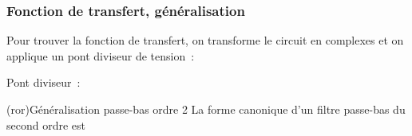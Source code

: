 \documentclass[../../main/main.tex]{subfiles}
\begin{document}
\subsubsection{Fonction de transfert, généralisation}
Pour trouver la fonction de transfert, on transforme le circuit en complexes et
on applique un pont diviseur de tension~:
\smallbreak
\noindent
\begin{minipage}[c]{.45\linewidth}
	\begin{center}
		\vspace{-15pt}
	\end{center}
\end{minipage}
\hfill
\begin{minipage}[c]{.5\linewidth}
	Pont diviseur~:
\end{minipage}
\begin{tcb*}(ror){Généralisation passe-bas ordre 2}
	La forme canonique d'un filtre passe-bas du second ordre est
	\psw{
	\[
		\boxed{\Hu(x) = \frac{H_0}{1-x^{2} + \jj \frac{x}{Q}}}
		\qav
		x = \frac{\w}{\w_0}
		\qet
		H_0 = \cte
		\qet
		Q \text{~ facteur de qualité}
	\]
	}
	\vspace{-15pt}
\end{tcb*}
\end{document}
